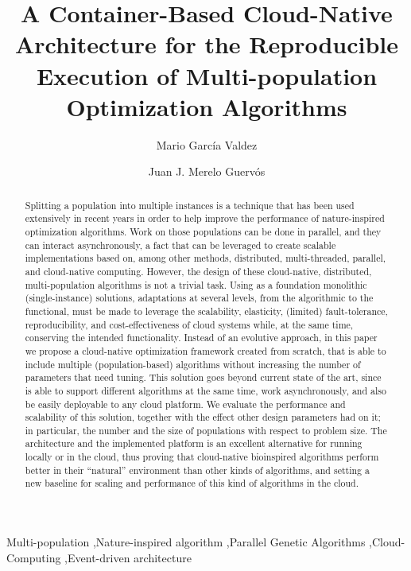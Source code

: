 \documentclass[review]{elsarticle}
\begin{document}
\lstset{language=Python} 
\begin{frontmatter}

\title{A Container-Based Cloud-Native Architecture for the Reproducible Execution of Multi-population Optimization Algorithms}

\author[itt]{Mario Garc\'ia Valdez}

\author[granada]{Juan J. Merelo Guerv\'os}

\address[itt]{Department of Graduate Studies, Instituto Tecnol\'ogico de Tijuana, Tijuana BC, Mexico}
\address[granada]{Department of Computer Architecture and Technology, Universidad de Granada, Granada, Spain}

\begin{abstract} 
Splitting a population into multiple instances is a technique that has
been used extensively in recent years in order to help improve the
performance of nature-inspired optimization algorithms. Work on those
populations can be done in parallel, and they can interact asynchronously,
a fact that can be leveraged to create scalable implementations based
on, among other methods, distributed, multi-threaded, parallel, and
cloud-native computing.  However, the design of these cloud-native,
distributed, multi-population algorithms is not a trivial task. Using
as a foundation monolithic (single-instance) solutions, adaptations at several
levels, from the algorithmic to the functional, must be made to
leverage the scalability, elasticity, (limited) fault-tolerance,
reproducibility, and cost-effectiveness of cloud systems while, at the
same time, conserving the intended functionality. Instead of an
evolutive approach, in this paper we propose a
cloud-native optimization framework created from scratch, that is able to include multiple
(population-based) algorithms without increasing the number of
parameters that need tuning. This solution goes beyond
current state of the art, since is able to support
different algorithms at the same time, work asynchronously, and also
be easily deployable to any cloud platform. We evaluate the
performance and scalability of this solution, together with the effect
other design parameters had on it; in particular, the number and the
size of populations with respect to problem size. The architecture and
the implemented platform is an excellent alternative for running
locally or in the cloud, thus proving that cloud-native bioinspired
algorithms perform better in their ``natural'' environment than other
kinds of algorithms, and setting a new baseline for scaling and
performance of this kind of algorithms in the cloud.
\end{abstract}

\begin{keyword}
Multi-population \sep Nature-inspired algorithm \sep Parallel Genetic Algorithms \sep Cloud-Computing
\sep Event-driven architecture 
\end{keyword}

\end{frontmatter}
\end{document}

